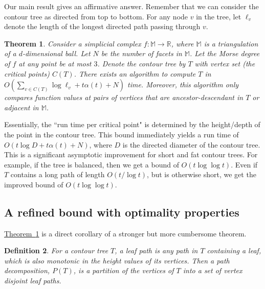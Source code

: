 \documentclass[11pt]{article}
\newtheorem{theorem}{Theorem}[section]
\newtheorem{definition}[theorem]{Definition}
\theoremstyle{definition}
\newcommand{\MM}{\mathbb{M}}
\newcommand{\RR}{\mathbb{R}}
\newcommand{\Thm}[1]{\hyperref[thm:#1]{Theorem~\ref*{thm:#1}}} %
\begin{document}
Our main result gives an affirmative answer. Remember that we can consider
the contour tree as directed from top to bottom. For any node $v$ in the tree, let $\ell_v$ denote the length of the 
longest directed path passing through $v$. 

\begin{theorem} \label{thm:main-corr} Consider a simplicial complex $f:\MM \to \RR$, where $\MM$
is a triangulation of a $d$-dimensional ball.
Let $N$ be the number of facets in $\MM$.
Let the Morse degree of $f$ at any point be at most $3$.
Denote
the contour tree by $T$ with vertex set (the critical points) $C(T)$. 
There exists an algorithm to compute $T$
in $O(\sum_{v \in C(T)} \log \ell_v + t\alpha(t) + N)$ time. Moreover, this algorithm only
compares function values at pairs of vertices that are ancestor-descendant in $T$ or adjacent in $\MM$.
\end{theorem}

Essentially, the ``run time per critical point" is determined by the height/depth of the point in the contour tree.
This bound immediately yields a run time of $O(t\log D + t\alpha(t) + N)$,
where $D$ is the directed diameter of the contour tree. 
This is a significant asymptotic improvement for short and fat contour trees. For example, if the tree is balanced,
then we get a bound of $O(t\log\log t)$.
Even if $T$ contains a long path of length $O(t/\log t)$, but is otherwise short, we get the improved bound of $O(t\log\log t)$.

\subsection{A refined bound with optimality properties}\label{sec:more-refined}

\Thm{main-corr} is a direct corollary of a stronger but more cumbersome theorem.



\begin{definition}
\label{def:path} 
For a contour tree $T$, a \emph{leaf path} is any path in $T$ containing a leaf, 
which is also monotonic in the height values of its vertices. 
Then a \emph{path decomposition}, $P(T)$, is a partition of the vertices of $T$ into a set of vertex disjoint leaf paths.  
\end{definition}
\end{document}
